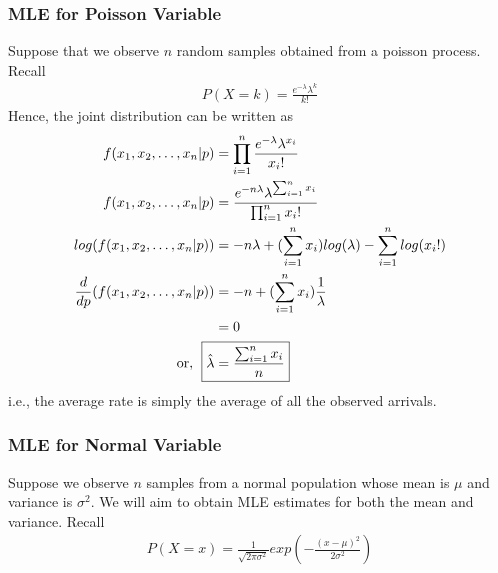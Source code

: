\documentclass[../probability-notes.tex]{subfiles}
\begin{document}
    \subsubsection{MLE for Poisson Variable}
    Suppose that we observe $n$ random samples obtained from a poisson process. Recall
    \begin{align*}
        P(X = k) = \frac{e^{-\lambda} \lambda^{k}}{k!}
    \end{align*}
    Hence, the joint distribution can be written as
    \begin{align*}
        f(x_{1}, x_{2}, \ldots, x_{n}|p) &= \prod_{i=1}^{n} \frac{e^{-\lambda} \lambda^{x_{i}}}{x_{i}!}\\
        f(x_{1}, x_{2}, \ldots, x_{n}|p) &= \frac{e^{-n\lambda} \lambda^{\sum_{i=1}^{n} x_{i}}}{\prod_{i=1}^{n} x_{i}!}\\
        log(f(x_{1}, x_{2}, \ldots, x_{n}|p)) &= -n\lambda + (\sum_{i=1}^{n} x_{i})log(\lambda) - \sum_{i=1}^{n} log(x_{i}!)\\
        \frac{d}{dp}(f(x_{1}, x_{2}, \ldots, x_{n}|p)) &= -n + (\sum_{i=1}^{n} x_{i})\frac{1}{\lambda}\\
        &= 0\\
        \text{or, \;} \Aboxed{\hat{\lambda} &= \frac{\sum_{i=1}^{n} x_{i}}{n}}
    \end{align*}
    i.e., the average rate is simply the average of all the observed arrivals.

    
    \subsubsection{MLE for Normal Variable}
    Suppose we observe $n$ samples from a normal population whose mean is $\mu$ and variance is $\sigma^{2}$. We will aim to obtain MLE estimates for both the mean and variance. Recall
    \begin{align*}
         P(X = x) = \frac{1}{\sqrt{2 \pi \sigma^{2}}} exp(-\frac{(x-\mu)^{2}}{2\sigma^{2}})
    \end{align*}
\end{document}
